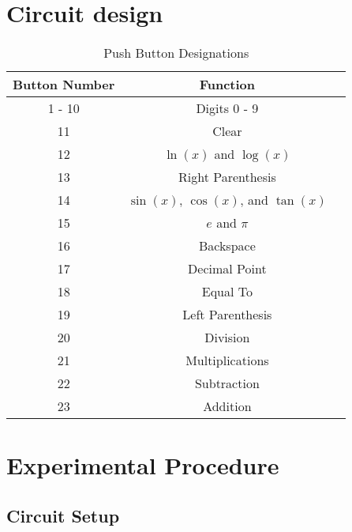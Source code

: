 \documentclass[12pt,a4paper]{article}
\begin{document}
\section*{Circuit design}
\begin{table}[H]
\centering
\caption{Push Button Designations}
\label{tab:functions}
\begin{tabular}{ccc}
\toprule
Button Number & Function \\
\midrule
1 - 10 & Digits 0 - 9 \\
11 & Clear \\
12 & $\ln{(x)}$ and $\log{(x)}$ \\
13 & Right Parenthesis \\
14 & $\sin{(x)}$, $\cos{(x)}$, and $\tan{(x)}$ \\
15 & $e$ and $\pi$ \\
16 & Backspace \\
17 & Decimal Point \\
18 & Equal To \\
19 & Left Parenthesis \\
20 & Division \\
21 & Multiplications \\
22 & Subtraction \\
23 & Addition \\
\bottomrule
\end{tabular}
\end{table}
\section*{Experimental Procedure}
\subsection{Circuit Setup}
\end{document}
